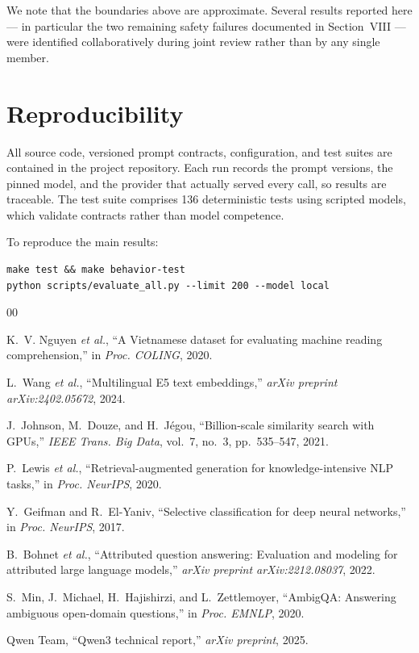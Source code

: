 \documentclass[conference]{IEEEtran}
\begin{document}
We note that the boundaries above are approximate. Several results reported here
--- in particular the two remaining safety failures documented in
Section~VIII --- were identified collaboratively during joint review rather than
by any single member.

\section*{Reproducibility}

All source code, versioned prompt contracts, configuration, and test suites are
contained in the project repository. Each run records the prompt versions, the
pinned model, and the provider that actually served every call, so results are
traceable. The test suite comprises 136 deterministic tests using scripted models,
which validate contracts rather than model competence.

To reproduce the main results:

\begin{lstlisting}[style=contract]
make test && make behavior-test
python scripts/evaluate_all.py --limit 200 --model local
\end{lstlisting}

\begin{thebibliography}{00}

 K.~V. Nguyen \emph{et al.}, ``A Vietnamese dataset for
evaluating machine reading comprehension,'' in \emph{Proc. COLING}, 2020.

 L.~Wang \emph{et al.}, ``Multilingual E5 text embeddings,''
\emph{arXiv preprint arXiv:2402.05672}, 2024.

 J.~Johnson, M.~Douze, and H.~J\'egou, ``Billion-scale similarity
search with GPUs,'' \emph{IEEE Trans. Big Data}, vol.~7, no.~3, pp.~535--547,
2021.

 P.~Lewis \emph{et al.}, ``Retrieval-augmented generation for
knowledge-intensive NLP tasks,'' in \emph{Proc. NeurIPS}, 2020.

 Y.~Geifman and R.~El-Yaniv, ``Selective classification for
deep neural networks,'' in \emph{Proc. NeurIPS}, 2017.

 B.~Bohnet \emph{et al.}, ``Attributed question answering:
Evaluation and modeling for attributed large language models,'' \emph{arXiv
preprint arXiv:2212.08037}, 2022.

 S.~Min, J.~Michael, H.~Hajishirzi, and L.~Zettlemoyer,
``AmbigQA: Answering ambiguous open-domain questions,'' in \emph{Proc. EMNLP},
2020.

 Qwen Team, ``Qwen3 technical report,'' \emph{arXiv preprint},
2025.

\end{thebibliography}
\end{document}

